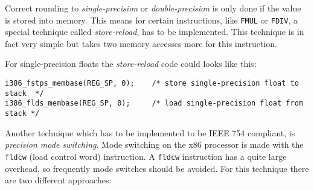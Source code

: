 Correct rounding to \textit{single-precision} or
\textit{double-precision} is only done if the value is stored into
memory. This means for certain instructions, like \texttt{FMUL} or
\texttt{FDIV}, a special technique called \textit{store-reload}, has
to be implemented. This technique is in fact very simple but takes two
memory accesses more for this instruction.

For single-precision floats the \textit{store-reload} code could looks
like this:

\begin{verbatim}
i386_fstps_membase(REG_SP, 0);    /* store single-precision float to stack  */
i386_flds_membase(REG_SP, 0);     /* load single-precision float from stack */
\end{verbatim}

Another technique which has to be implemented to be IEEE 754
compliant, is \textit{precision mode switching}. Mode switching on the
x86 processor is made with the \texttt{fldcw} (load control word)
instruction. A \texttt{fldcw} instruction has a quite large overhead,
so frequently mode switches should be avoided. For this technique
there are two different approaches:

